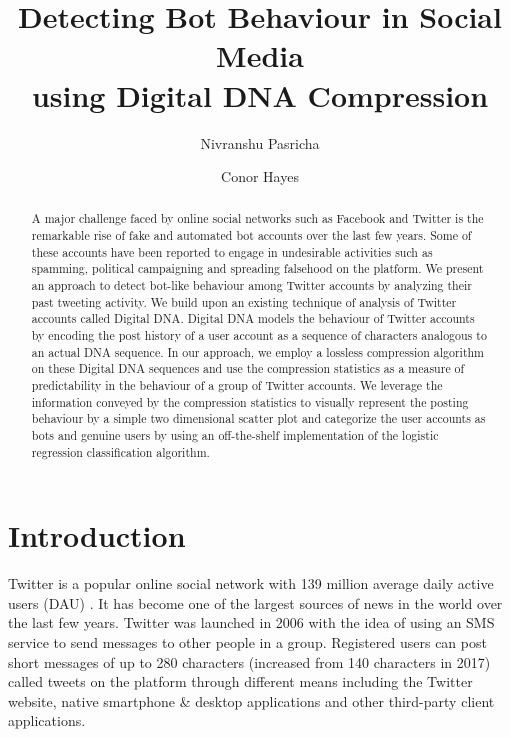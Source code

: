 \documentclass{llncs}
\title{Detecting Bot Behaviour in Social Media \\ using Digital DNA Compression}
\author{Nivranshu Pasricha \and Conor Hayes}
\institute{Insight Centre for Data Analytics \\ Data Science Institute \\ National University of Ireland Galway \\
\email{\tt name.surname@insight-centre.org} }
\begin{document}
\maketitle

\begin{abstract}
A major challenge faced by online social networks such as Facebook and Twitter is the remarkable rise of fake and automated bot accounts over the last few years. Some of these accounts have been reported to engage in undesirable activities such as spamming, political campaigning and spreading falsehood on the platform. We present an approach to detect bot-like behaviour among Twitter accounts by analyzing their past tweeting activity. We build upon an existing technique of analysis of Twitter accounts called Digital DNA. Digital DNA models the behaviour of Twitter accounts by encoding the post history of a user account as a sequence of characters analogous to an actual DNA sequence. In our approach, we employ a lossless compression algorithm on these Digital DNA sequences and use the compression statistics as a measure of predictability in the behaviour of a group of Twitter accounts. We leverage the information conveyed by the compression statistics to visually represent the posting behaviour by a simple two dimensional scatter plot and categorize the user accounts as bots and genuine users by using an off-the-shelf implementation of the logistic regression classification algorithm.



\end{abstract}

\section{Introduction}

Twitter is a popular online social network with 139 million average daily active users (DAU) \cite{twitter_quarterly_results_2019}. It has become one of the largest sources of news in the world over the last few years. Twitter was launched in 2006 with the idea of using an SMS service to send messages to other people in a group. Registered users can post short messages of up to 280 characters (increased from 140 characters in 2017) called tweets on the platform through different means including the Twitter website, native smartphone \& desktop applications and other third-party client applications.
\end{document}
